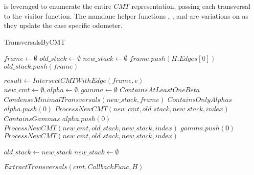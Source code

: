  is leveraged to enumerate the entire $CMT$ representation, passing each transversal to the visitor function. The mundane helper functions , , and  are variations on  as they update the case specific odometer. 

\begin{algorithm}[H]
    \centering
	\caption{TransversalsByCMT}
	\label{TransversalsByCMT}
	\begin{algorithmic}[1]
		\State $frame \gets \emptyset$ 
		\State $old\_stack \gets \emptyset$ 
		\State $new\_stack \gets \emptyset$ 
		\State $frame.push(H.Edges[0])$ 
		\State $old\_stack.push(frame)$
		 
		
		\State $result \gets IntersectCMTWithEdge(frame,e)$
		\State $new\_cmt \gets \emptyset, alpha \gets \emptyset, gamma \gets \emptyset$
		\Case $ContainsAtLeastOneBeta$
		\State $CondenseMinimalTransversals(new\_stack,frame)$
		\EndCase
		\Case $ContainsOnlyAlphas$
		\State $alpha.push(0)$
		\State $ProcessNewCMT(new\_cmt,old\_stack,new\_stack,index)$
		\EndWhile
		\EndCase
		\Case $ContainsGammas$
		\State $alpha.push(0)$
		\State $ProcessNewCMT(new\_cmt,old\_stack,new\_stack,index)$
		\EndWhile
		\EndIf
		\State $gamma.push(0)$
		\EndFor
		\State $ProcessNewCMT(new\_cmt,old\_stack,new\_stack,index)$
		\EndWhile
		
		\EndCase
		\EndSwitch
		
		\EndFor
		\State $old\_stack \gets new\_stack$
		\State $new\_stack \gets \emptyset$
        \EndFor
        
          
        \State $ExtractTransversals(cmt,CallbackFunc,H)$
        \EndFor
        
        \EndFunction
	\end{algorithmic}
\end{algorithm}





